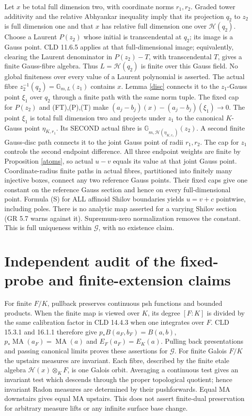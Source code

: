 \documentclass[11pt]{article}
\newcommand{\MA}{\operatorname{MA}}
\newcommand{\G}{\mathcal G}
\newcommand{\HH}{\mathscr H}
\theoremstyle{remark}\newtheorem{remark}[theorem]{Remark}
\begin{document}
Let $x$ be total full dimension two, with coordinate norms $r_1,r_2$.
Graded tower additivity and the relative Abhyankar inequality imply
that its projection $q_2$ to $z_2$ is full dimension one and that $x$
has relative full dimension one over $\HH(q_2)$. Choose a Laurent
$P(z_2)$ whose initial is transcendental at $q_2$; its image is a
Gauss point. CLD 11.6.5 applies at that full-dimensional image;
equivalently, clearing the Laurent denominator in $P(z_2)-T$, with
transcendental $T$, gives a finite Gauss-fibre algebra. Thus
$L=\HH(q_2)$ is finite over this Gauss field. No global finiteness
over every value of a Laurent polynomial is asserted. The actual fibre
$z_2^{-1}(q_2)=\mathbb G_{m,L}(z_1)$ contains $x$.
Lemma \ref{disc} connects it to the $z_1$-Gauss point $\xi_1$ over
$q_2$ through a finite path with the same norm tuple. The fixed cap for
$P(z_2)$ and (FT),(P),(T) make
$(a_j-b_j)(x)-(a_j-b_j)(\xi_1)\to0$.
The point $\xi_1$ is total full dimension two and projects under $z_1$
to the canonical $K$-Gauss point $\eta_{K,r_1}$.
Its SECOND actual fibre is
$\mathbb G_{m,\HH(\eta_{K,r_1})}(z_2)$. A second finite Gauss-disc
path connects it to the joint Gauss point of radii $r_1,r_2$.
The cap for $z_1$ controls the second endpoint difference. All three
endpoint weights are finite by Proposition \ref{atoms}, so actual
$u-v$ equals its value at that joint Gauss point.
Coordinate-radius finite paths in actual fibres, partitioned into
finitely many injective boxes, connect any two reference Gauss points.
Their fixed caps give one constant on the reference Gauss section and
hence on every full-dimensional point. Formula (S) for ALL affinoid
Shilov boundaries yields $u=v+c$ pointwise, including poles. There is
no analytic map asserted for a varying Shilov section (GR 5.7 warns
against it). Supremum-zero normalization removes the constant.
This is full uniqueness within $\G$, with no existence claim.

\section{Independent audit of the fixed-probe and finite-extension claims}
For finite $F/K$, pullback preserves continuous psh functions and
bounded products. When the finite map is viewed over $K$, its degree
$[F:K]$ is divided by the same calibration factor in CLD 14.4.3 when
one integrates over $F$. CLD 15.3.1 and 16.1.1 therefore give
$p_*B(a_F,b_F)=B(a,b)$, $p_*\MA(a_F)=\MA(a)$ and
$E_F(a_F)=E_K(a)$. Pulling back presentations and passing canonical
limits proves these assertions for $\G$. For finite Galois $F/K$ the
upstairs measures are invariant. Each fibre, described by the finite
etale algebra $\HH(x)\otimes_KF$, is one Galois orbit. Averaging a
continuous test gives an invariant test which descends through the
proper topological quotient; hence invariant Radon measures are
determined by their pushforwards. Equal MA downstairs gives equal MA
upstairs. This does not assert finite-dual preservation for arbitrary
measure lifts or any infinite surface base change.
\end{document}
